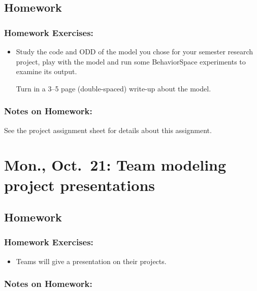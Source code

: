 \documentclass[
]{article}
\providecommand{\tightlist}{%
  \setlength{\itemsep}{0pt}\setlength{\parskip}{0pt}}
\begin{document}
\subsection{Homework}\label{homework-9}

\subsubsection{Homework Exercises:}\label{homework-exercises-9}

\begin{itemize}
\item
  Study the code and ODD of the model you chose for your semester
  research project, play with the model and run some BehaviorSpace
  experiments to examine its output.

  Turn in a 3--5 page (double-spaced) write-up about the model.
\end{itemize}

\subsubsection{Notes on Homework:}\label{notes-on-homework-5}

See the project assignment sheet for details about this assignment.

\section{Mon., Oct.~21: Team modeling project
presentations}\label{mon.-oct.-21-team-modeling-project-presentations}

\subsection{Homework}\label{homework-10}

\subsubsection{Homework Exercises:}\label{homework-exercises-10}

\begin{itemize}
\tightlist
\item
  Teams will give a presentation on their projects.
\end{itemize}

\subsubsection{Notes on Homework:}\label{notes-on-homework-6}
\end{document}
